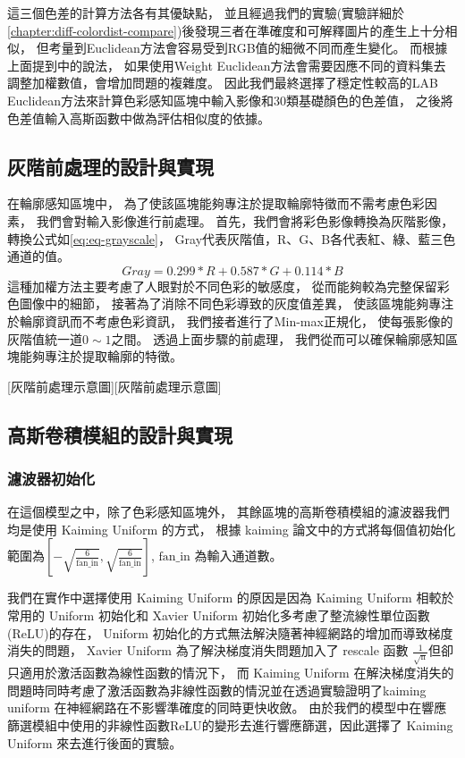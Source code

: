 \documentclass[class=NCU_thesis, crop=false]{standalone}
\begin{document}
			這三個色差的計算方法各有其優缺點，
			並且經過我們的實驗(實驗詳細於\cref{chapter:diff-colordist-compare})後發現三者在準確度和可解釋圖片的產生上十分相似，
			但考量到Euclidean方法會容易受到RGB值的細微不同而產生變化。
			而根據上面提到\cite{LABformula}中的說法，
			如果使用Weight Euclidean方法會需要因應不同的資料集去調整加權數值，會增加問題的複雜度。
			因此我們最終選擇了穩定性較高的LAB Euclidean方法來計算色彩感知區塊中輸入影像和30類基礎顏色的色差值，
			之後將色差值輸入高斯函數中做為評估相似度的依據。

	\subsection{灰階前處理的設計與實現}
		在輪廓感知區塊中，
		為了使該區塊能夠專注於提取輪廓特徵而不需考慮色彩因素，
		我們會對輸入影像進行前處理。
		首先，我們會將彩色影像轉換為灰階影像，
		轉換公式如\cref{eq:eq-grayscale}，
		Gray代表灰階值，R、G、B各代表紅、綠、藍三色通道的值。
		\begin{equation}
		    \label{eq:eq-grayscale}
		    Gray = 0.299 * R + 0.587 * G + 0.114 * B
		\end{equation}
		這種加權方法主要考慮了人眼對於不同色彩的敏感度，
		從而能夠較為完整保留彩色圖像中的細節，
		接著為了消除不同色彩導致的灰度值差異，
		使該區塊能夠專注於輪廓資訊而不考慮色彩資訊，
		我們接者進行了Min-max正規化，
		使每張影像的灰階值統一道$0\sim1$之間。
		透過上面步驟的前處理，
		我們從而可以確保輪廓感知區塊能夠專注於提取輪廓的特徵。

		[灰階前處理示意圖][灰階前處理示意圖]

	\subsection{高斯卷積模組的設計與實現}
		\subsubsection{濾波器初始化}
			在這個模型之中，除了色彩感知區塊外，
			其餘區塊的高斯卷積模組的濾波器我們均是使用 Kaiming Uniform 的方式，
			根據 kaiming 論文\cite{DBLP:journals/corr/HeZR015}中的方式將每個值初始化範圍為$[-\sqrt{\frac{6}{\text{fan\_in}}}, \sqrt{\frac{6}{\text{fan\_in}}}]$,
			$\text{fan\_in}$ 為輸入通道數。

			我們在實作中選擇使用 Kaiming Uniform 的原因是因為 Kaiming Uniform 相較於常用的 Uniform 初始化和 Xavier Uniform\cite{pmlr-v9-glorot10a} 初始化多考慮了整流線性單位函數(ReLU)的存在，
			Uniform 初始化的方式無法解決隨著神經網路的增加而導致梯度消失的問題，
			Xavier Uniform 為了解決梯度消失問題加入了 rescale 函數 $\frac{1}{\sqrt{\text{n}}}$但卻只適用於激活函數為線性函數的情況下，
			而 Kaiming Uniform 在解決梯度消失的問題時同時考慮了激活函數為非線性函數的情況並在\cite{DBLP:journals/corr/HeZR015}透過實驗證明了kaiming uniform 在神經網路在不影響準確度的同時更快收斂。
			由於我們的模型中在響應篩選模組中使用的非線性函數ReLU的變形去進行響應篩選，因此選擇了 Kaiming Uniform 來去進行後面的實驗。
\end{document}

